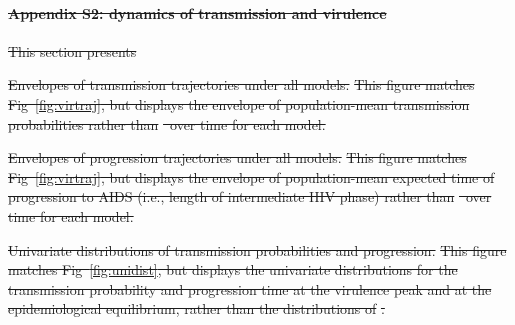 \documentclass[10pt,letterpaper]{article}
\renewcommand{\figurename}{Fig}
\newcommand{\Lspvl}{$\log_{10}$ SPVL}
\providecommand{\DIFdeltex}[1]{{\protect\color{red}\sout{#1}}}                      %
\providecommand{\DIFaddbegin}{} %
\providecommand{\DIFaddend}{} %
\providecommand{\DIFdelbegin}{} %
\providecommand{\DIFdelend}{} %
\providecommand{\DIFdelFL}[1]{\DIFdel{#1}} %
\providecommand{\DIFdel}[1]{\texorpdfstring{\DIFdeltex{#1}}{}} %
\newcommand{\DIFscaledelfig}{0.5}
\newlength{\DIFdelgraphicswidth} %
\newlength{\DIFdelgraphicsheight} %
\newcommand{\DIFaddincludegraphics}[2][]{{\color{blue}\fbox{\DIFOincludegraphics[#1]{#2}}}} %
\newcommand{\DIFdelincludegraphics}[2][]{%
\sbox{\DIFdelgraphicsbox}{\DIFOincludegraphics[#1]{#2}}%
\settoboxwidth{\DIFdelgraphicswidth}{\DIFdelgraphicsbox} %
\settoboxtotalheight{\DIFdelgraphicsheight}{\DIFdelgraphicsbox} %
\scalebox{\DIFscaledelfig}{%
\parbox[b]{\DIFdelgraphicswidth}{\usebox{\DIFdelgraphicsbox}\\[-\baselineskip] \rule{\DIFdelgraphicswidth}{0em}}\llap{\resizebox{\DIFdelgraphicswidth}{\DIFdelgraphicsheight}{%
\setlength{\unitlength}{\DIFdelgraphicswidth}%
\begin{picture}(1,1)%
\thicklines\linethickness{2pt} %
{\color[rgb]{1,0,0}\put(0,0){\framebox(1,1){}}}%
{\color[rgb]{1,0,0}\put(0,0){\line( 1,1){1}}}%
{\color[rgb]{1,0,0}\put(0,1){\line(1,-1){1}}}%
\end{picture}%
}\hspace*{3pt}}} %
} %
\DeclareRobustCommand{\DIFaddbegin}{\DIFOaddbegin \let\includegraphics\DIFaddincludegraphics} %
\DeclareRobustCommand{\DIFaddend}{\DIFOaddend \let\includegraphics\DIFOincludegraphics} %
\DeclareRobustCommand{\DIFdelbegin}{\DIFOdelbegin \let\includegraphics\DIFdelincludegraphics} %
\DeclareRobustCommand{\DIFdelend}{\DIFOaddend \let\includegraphics\DIFOincludegraphics} %
\begin{document}
\paragraph*{\DIFdel{Appendix S2: dynamics of transmission and virulence}}

\DIFdelend \label{S2_Appendix}

\DIFdelbegin \DIFdel{This section presents
}\DIFdelend \DIFaddbegin \clearpage
\DIFaddend 

\DIFdelbegin %
{%
\DIFdelFL{Envelopes of transmission trajectories under all models.}%
\DIFdelFL{This figure matches \figurename~\ref{fig:virtraj}, but displays the
envelope of population-mean transmission probabilities rather than }%
\DIFdelFL{\ over time
for each model.
}}

{%
\DIFdelFL{Envelopes of progression trajectories under all models.}%
\DIFdelFL{This figure matches \figurename~\ref{fig:virtraj}, but displays the
envelope of population-mean expected time of progression to AIDS (i.e., length of
intermediate HIV phase) rather than }%
\DIFdelFL{\ over time
for each model.
}}

{%
\DIFdelFL{Univariate distributions of transmission probabilities and progression.}%
\DIFdelFL{This figure matches \figurename~\ref{fig:unidist}, but displays the
univariate distributions for the transmission probability and 
progression time at the virulence
peak and at the epidemiological equilibrium,
rather than the distributions of }%
\DIFdelFL{.
}}
\end{document}

